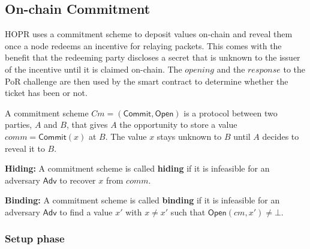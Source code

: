 \subsection{On-chain Commitment}

HOPR uses a commitment scheme to deposit values on-chain and reveal them once a node redeems an incentive for relaying packets. This comes with the benefit that the redeeming party discloses a secret that is unknown to the issuer of the incentive until it is claimed on-chain. The $opening$ and the $response$ to the PoR challenge are then used by the smart contract to determine whether the ticket has been or not.

\begin{defnsub}
    A commitment scheme $Cm = (\mathsf{Commit}, \mathsf{Open})$ is a protocol between two parties, $A$ and $B$, that gives $A$ the opportunity to store a value $comm = \mathsf{Commit}(x)$ at $B$. The value $x$ stays unknown to $B$ until $A$ decides to reveal it to $B$.

    \noindent\textbf{Hiding:} A commitment scheme is called \textbf{hiding} if it is infeasible for an adversary $\mathsf{Adv}$ to recover $x$ from $comm$.

    \noindent\textbf{Binding:} A commitment scheme is called \textbf{binding} if it is infeasible for an adversary $\mathsf{Adv}$ to find a value $x'$ with $x \neq x'$ such that $\mathsf{Open}(cm, x') \neq \bot$.
\end{defnsub}

\subsubsection{Setup phase}

